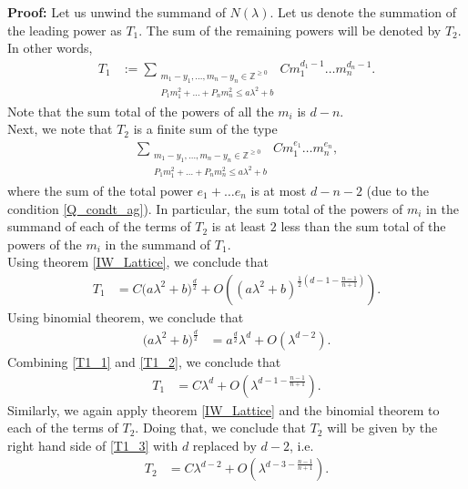 \documentclass[11pt,lettersize,reqno,fullpage]{amsart}
\providecommand \hf{\hspace*{0.5cm}}
\begin{document}
\noindent \textbf{Proof:} Let us unwind the summand of $N(\lambda)$. Let us denote the summation of the leading 
power as $T_1$. The sum of the remaining powers will be denoted by $T_2$. In other words, 
\begin{align}
T_1 &:= \sum_{\substack{m_1-y_1, \ldots, m_n-y_n \in \mathbb{Z}^{\geq 0}\\ P_1 m_1^2 + \ldots + P_n m_n^2 \leq a\lambda^2+b}} 
C m_1^{d_1-1}\ldots m_n^{d_n-1}.
\end{align} 
Note that the sum total of the powers of all the $m_i$ is $d-n$. \\ 
\hf \hf Next, we note that $T_2$ is a finite sum of the type 
\begin{align} 
\sum_{\substack{m_1-y_1, \ldots, m_n-y_n \in \mathbb{Z}^{\geq 0}\\ P_1 m_1^2 + \ldots + P_n m_n^2 \leq a\lambda^2+b}} 
C m_1^{e_1}\ldots m_n^{e_n},
\end{align}
where the sum of the total power $e_1+\ldots e_n$ is at most $d-n-2$ 
(due to the condition \ref{Q_condt_ag}). In particular, the sum total of the powers of $m_i$ in the 
summand of each of the terms of $T_2$ is at least $2$ less than the 
sum total of the powers  of the $m_i$ in the summand of $T_1$. \\ 
\hf \hf Using theorem \ref{IW_Lattice}, we conclude that 
\begin{align}
T_1& = C \Big(a \lambda^2 + b\Big)^{\frac{d}{2}} + O\left((a \lambda^2 + b)^{\frac{1}{2}\left(d-1-\frac{n-1}{n+1}\right)}\right). \label{T1_1}
\end{align}
Using binomial theorem, we conclude that 
\begin{align} 
\Big(a \lambda^2 + b\Big)^{\frac{d}{2}} & = a^{\frac{d}{2}} \lambda^{d} + O(\lambda^{d-2}). \label{T1_2}
\end{align}
Combining \eqref{T1_1} and \eqref{T1_2}, we conclude that 
\begin{align}
T_1 & = C \lambda^{d} + O(\lambda^{d-1-\frac{n-1}{n+1}}). \label{T1_3}
\end{align}
Similarly, we again apply theorem \ref{IW_Lattice} and the 
binomial theorem to each of the terms of $T_2$. Doing that, we 
conclude that 
$T_2$ will be given by the right hand side of \eqref{T1_3} with $d$ replaced by $d-2$, i.e. 
\begin{align} 
T_2 & = C \lambda^{d-2} + O(\lambda^{d-3-\frac{n-1}{n+1}}). \label{T2_initial}
\end{align}
\end{document}
